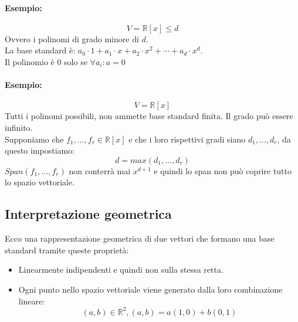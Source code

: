 \documentclass[12pt,a4paper]{article}
\begin{document}
\paragraph{Esempio:}
\[
V = \mathbb{R}[x] \leq d
\]
Ovvero i polinomi di grado minore di $d$.\\
La base standard è: $a_0 \cdot 1 + a_1 \cdot x + a_2 \cdot x^2 + \cdots + a_d \cdot x^d$.\\
Il polinomio è 0 solo se $\forall a_i : a = 0$
\paragraph{Esempio:}
\[
V = \mathbb{R}[x]
\]
Tutti i polinomi possibili, non ammette base standard finita. Il grado può essere infinito.\\
Supponiamo che $f_1,\ldots,f_r \in \mathbb{R}[x]$ e che i loro rispettivi gradi siano $d_1,\ldots,d_r$, da questo impostiamo:
\[
d = max(d_1,\ldots,d_r)
\]
$Span(f_1,\ldots,f_r)$ non conterrà mai $x^{d+1}$ e quindi lo span non può coprire tutto lo spazio vettoriale.

\subsection{Interpretazione geometrica}
Ecco una rappresentazione geometrica di due vettori che formano una base standard tramite queste proprietà:
\begin{itemize}
  \item Linearmente indipendenti e quindi non sulla stessa retta.
  \item Ogni punto nello spazio vettoriale viene generato dalla loro combinazione lineare:
  \[
  (a,b) \in \mathbb{R}^2, (a,b) = a(1,0) + b(0,1)
  \]
\end{itemize}
\begin{center}
\end{center}
\end{document}
